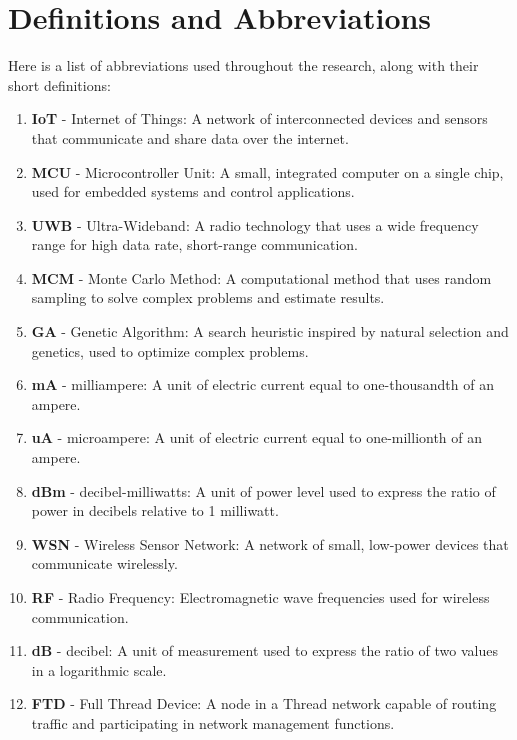 \chapter*{Definitions and Abbreviations}\label{chap:additional_chapters}


Here is a list of abbreviations used throughout the research, along with their short definitions:

\begin{enumerate}
    \item \textbf{IoT} - Internet of Things: A network of interconnected devices and sensors that communicate and share data over the internet.
    \item \textbf{MCU} - Microcontroller Unit: A small, integrated computer on a single chip, used for embedded systems and control applications.
    \item \textbf{UWB} - Ultra-Wideband: A radio technology that uses a wide frequency range for high data rate, short-range communication.
    \item \textbf{MCM} - Monte Carlo Method: A computational method that uses random sampling to solve complex problems and estimate results.
    \item \textbf{GA} - Genetic Algorithm: A search heuristic inspired by natural selection and genetics, used to optimize complex problems.
    \item \textbf{mA} - milliampere: A unit of electric current equal to one-thousandth of an ampere.
    \item \textbf{uA} - microampere: A unit of electric current equal to one-millionth of an ampere.
    \item \textbf{dBm} - decibel-milliwatts: A unit of power level used to express the ratio of power in decibels relative to 1 milliwatt.
    \item \textbf{WSN} - Wireless Sensor Network: A network of small, low-power devices that communicate wirelessly.
    \item \textbf{RF} - Radio Frequency: Electromagnetic wave frequencies used for wireless communication.
    \item \textbf{dB} - decibel: A unit of measurement used to express the ratio of two values in a logarithmic scale.
    \item \textbf{FTD} - Full Thread Device: A node in a Thread network capable of routing traffic and participating in network management functions.

\end{enumerate}
